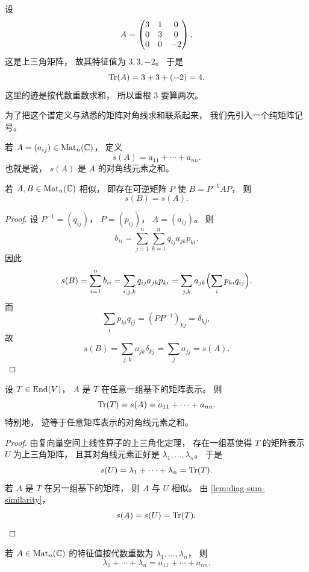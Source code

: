 \begin{example} 设 \[ A=\begin{pmatrix} 3&1&0\\0&3&0\\0&0&-2 \end{pmatrix}. \] 这是上三角矩阵， 故其特征值为 \(3,3,-2\)。 于是 \[ \mathrm{Tr}(A)=3+3+(-2)=4. \] 这里的迹是按代数重数求和， 所以重根 \(3\) 要算两次。 \end{example} 为了把这个谱定义与熟悉的矩阵对角线求和联系起来， 我们先引入一个纯矩阵记号。




\begin{definition} 若 \(A=(a_{ij})\in \mathrm{Mat}_n(\mathbb{C})\)， 定义 \[ s(A)=a_{11}+\cdots+a_{nn}. \] 也就是说， \(s(A)\) 是 \(A\) 的对角线元素之和。 \end{definition}




\begin{lemma}\label{lem:diag-sum-similarity} 若 \(A,B\in \mathrm{Mat}_n(\mathbb{C})\) 相似， 即存在可逆矩阵 \(P\) 使 \(B=P^{-1}AP\)， 则 \[ s(B)=s(A). \] \end{lemma}




\begin{proof} 设 \(P^{-1}=(q_{ij})\)， \(P=(p_{ij})\)， \(A=(a_{ij})\)。 则 \[ b_{ii}=\sum_{j=1}^n\sum_{k=1}^n q_{ij}a_{jk}p_{ki}. \] 因此 \[ s(B)=\sum_{i=1}^n b_{ii} =\sum_{i,j,k} q_{ij}a_{jk}p_{ki} =\sum_{j,k} a_{jk}\Bigl(\sum_i p_{ki}q_{ij}\Bigr). \] 而 \[ \sum_i p_{ki}q_{ij}=(PP^{-1})_{kj}=\delta_{kj}, \] 故 \[ s(B)=\sum_{j,k} a_{jk}\delta_{kj} =\sum_j a_{jj} =s(A). \] \end{proof}




\begin{theorem}\label{thm:trace-diagonal-sum} 设 \(T\in \mathrm{End}(V)\)， \(A\) 是 \(T\) 在任意一组基下的矩阵表示。 则 \[ \mathrm{Tr}(T)=s(A)=a_{11}+\cdots+a_{nn}. \] 特别地， 迹等于任意矩阵表示的对角线元素之和。 \end{theorem}




\begin{proof} 由复向量空间上线性算子的上三角化定理， 存在一组基使得 \(T\) 的矩阵表示 \(U\) 为上三角矩阵， 且其对角线元素正好是 \(\lambda_1,\dots,\lambda_n\)。 于是 \[ s(U)=\lambda_1+\cdots+\lambda_n=\mathrm{Tr}(T). \] 若 \(A\) 是 \(T\) 在另一组基下的矩阵， 则 \(A\) 与 \(U\) 相似。 由 \cref{lem:diag-sum-similarity}， \[ s(A)=s(U)=\mathrm{Tr}(T). \] \end{proof}




\begin{corollary} 若 \(A\in \mathrm{Mat}_n(\mathbb{C})\) 的特征值按代数重数为 \(\lambda_1,\dots,\lambda_n\)， 则 \[ \lambda_1+\cdots+\lambda_n=a_{11}+\cdots+a_{nn}. \] \end{corollary}




